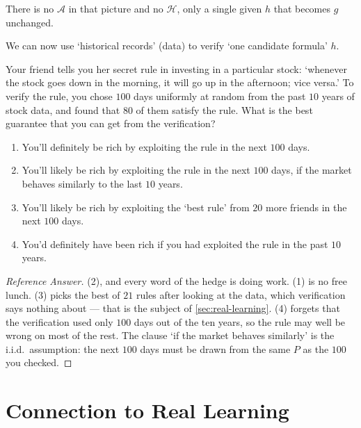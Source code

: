 There is no \(\mathcal{A}\) in that picture and no \(\mathcal{H}\), only a single
given \(h\) that becomes \(g\) unchanged.

\begin{moral}
    We can now use `historical records' (data) to verify `one candidate formula'
    \(h\).
\end{moral}

\begin{exercise}
    Your friend tells you her secret rule in investing in a particular stock:
    `whenever the stock goes down in the morning, it will go up in the
    afternoon; vice versa.' To verify the rule, you chose \(100\) days uniformly
    at random from the past \(10\) years of stock data, and found that \(80\) of
    them satisfy the rule. What is the best guarantee that you can get from the
    verification?
    \begin{enumerate}[(1)]
        \item You'll definitely be rich by exploiting the rule in the next
            \(100\) days.
        \item You'll likely be rich by exploiting the rule in the next \(100\)
            days, if the market behaves similarly to the last \(10\) years.
        \item You'll likely be rich by exploiting the `best rule' from \(20\)
            more friends in the next \(100\) days.
        \item You'd definitely have been rich if you had exploited the rule in
            the past \(10\) years.
    \end{enumerate}
\end{exercise}

\begin{proof}[Reference Answer]
    (2), and every word of the hedge is doing work. (1) is no free lunch. (3)
    picks the best of \(21\) rules after looking at the data, which verification
    says nothing about --- that is the subject of \autoref{sec:real-learning}.
    (4) forgets that the verification used only \(100\) days out of the ten
    years, so the rule may well be wrong on most of the rest. The clause `if the
    market behaves similarly' is the i.i.d.\ assumption: the next \(100\) days
    must be drawn from the same \(P\) as the \(100\) you checked.
\end{proof}

\section{Connection to Real Learning}\label{sec:real-learning}

